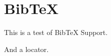 
\def\mytitle{MultiMarkdown BibTeX Test}
\def\bibliocommand{}

\part{BibTeX}
\label{bibtex}

This is a test of BibTeX Support.~\citep{Knuth:1968}

And a locator.~\citep[p. 123]{Knuth:1981}




